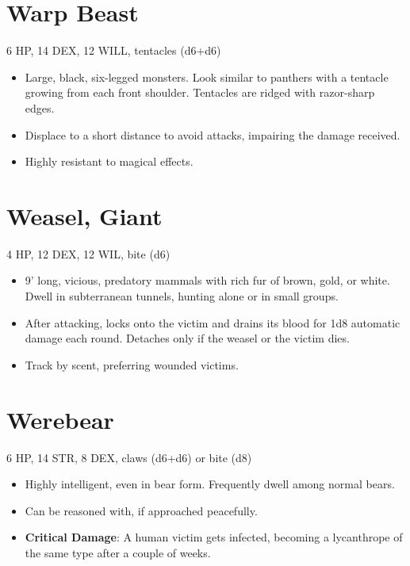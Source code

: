 \documentclass[
  10pt,
  american,
]{article}
\begin{document}
\hypertarget{warp-beast}{%
\section{Warp Beast}\label{warp-beast}}

6 HP, 14 DEX, 12 WILL, tentacles (d6+d6)

\begin{samepage}
\begin{itemize}
\setlength\itemsep{-.5em}
\item Large, black, six-legged monsters. Look similar to panthers with a tentacle growing from each front shoulder. Tentacles are ridged with razor-sharp edges.
\item Displace to a short distance to avoid attacks, impairing the damage received.
\item Highly resistant to magical effects.
\end{itemize}
\end{samepage}

\hypertarget{weasel-giant}{%
\section{Weasel, Giant}\label{weasel-giant}}

4 HP, 12 DEX, 12 WIL, bite (d6)

\begin{samepage}
\begin{itemize}
\setlength\itemsep{-.5em}
\item 9’ long, vicious, predatory mammals with rich fur of brown, gold, or white. Dwell in subterranean tunnels, hunting alone or in small groups.
\item After attacking, locks onto the victim and drains its blood for 1d8 automatic damage each round. Detaches only if the weasel or the victim dies.
\item Track by scent, preferring wounded victims.
\end{itemize}
\end{samepage}

\hypertarget{werebear}{%
\section{Werebear}\label{werebear}}

6 HP, 14 STR, 8 DEX, claws (d6+d6) or bite (d8)

\begin{samepage}
\begin{itemize}
\setlength\itemsep{-.5em}
\item Highly intelligent, even in bear form. Frequently dwell among normal bears.
\item Can be reasoned with, if approached peacefully.
\item \textbf{Critical Damage}: A human victim gets infected, becoming a lycanthrope of the same type after a couple of weeks.
\end{itemize}
\end{samepage}
\end{document}
